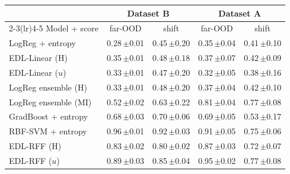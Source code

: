 \begin{tabular}{lcccc}\toprule
 & \multicolumn{2}{c}{Dataset B} & \multicolumn{2}{c}{Dataset A}\\
\cmidrule(lr){2-3}\cmidrule(lr){4-5}
Model + score & far-OOD & shift & far-OOD & shift\\\midrule
LogReg + entropy & 0.28\,{\scriptsize$\pm$0.01} & 0.45\,{\scriptsize$\pm$0.20} & 0.35\,{\scriptsize$\pm$0.04} & 0.41\,{\scriptsize$\pm$0.10}\\
EDL-Linear (H) & 0.35\,{\scriptsize$\pm$0.01} & 0.48\,{\scriptsize$\pm$0.18} & 0.37\,{\scriptsize$\pm$0.07} & 0.42\,{\scriptsize$\pm$0.09}\\
EDL-Linear ($u$) & 0.33\,{\scriptsize$\pm$0.01} & 0.47\,{\scriptsize$\pm$0.20} & 0.32\,{\scriptsize$\pm$0.05} & 0.38\,{\scriptsize$\pm$0.16}\\
LogReg ensemble (H) & 0.33\,{\scriptsize$\pm$0.01} & 0.48\,{\scriptsize$\pm$0.20} & 0.37\,{\scriptsize$\pm$0.04} & 0.42\,{\scriptsize$\pm$0.10}\\
LogReg ensemble (MI) & 0.52\,{\scriptsize$\pm$0.02} & 0.63\,{\scriptsize$\pm$0.22} & 0.81\,{\scriptsize$\pm$0.04} & 0.77\,{\scriptsize$\pm$0.08}\\
GradBoost + entropy & 0.68\,{\scriptsize$\pm$0.03} & 0.70\,{\scriptsize$\pm$0.06} & 0.69\,{\scriptsize$\pm$0.05} & 0.53\,{\scriptsize$\pm$0.17}\\
RBF-SVM + entropy & 0.96\,{\scriptsize$\pm$0.01} & 0.92\,{\scriptsize$\pm$0.03} & 0.91\,{\scriptsize$\pm$0.05} & 0.75\,{\scriptsize$\pm$0.06}\\
EDL-RFF (H) & 0.83\,{\scriptsize$\pm$0.02} & 0.80\,{\scriptsize$\pm$0.02} & 0.87\,{\scriptsize$\pm$0.03} & 0.72\,{\scriptsize$\pm$0.07}\\
EDL-RFF ($u$) & 0.89\,{\scriptsize$\pm$0.03} & 0.85\,{\scriptsize$\pm$0.04} & 0.95\,{\scriptsize$\pm$0.02} & 0.77\,{\scriptsize$\pm$0.08}\\
\bottomrule\end{tabular}